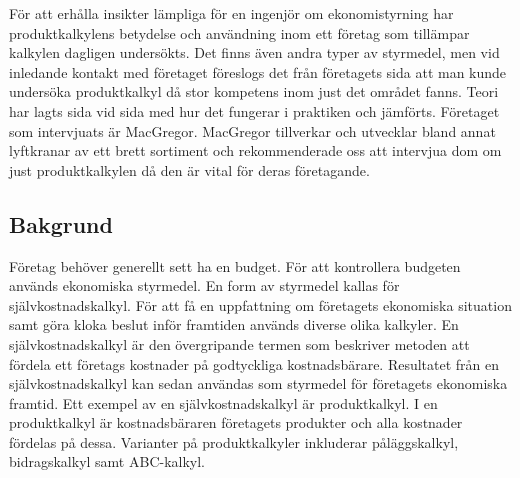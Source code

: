 För att erhålla insikter lämpliga för en ingenjör om ekonomistyrning har produktkalkylens betydelse och användning inom ett företag som tillämpar kalkylen dagligen undersökts.
Det finns även andra typer av styrmedel, men vid inledande kontakt med företaget föreslogs det från företagets sida att man kunde undersöka produktkalkyl då stor kompetens inom just det området fanns.
Teori har lagts sida vid sida med hur det fungerar i praktiken och jämförts.
Företaget som intervjuats är MacGregor.
MacGregor tillverkar och utvecklar bland annat lyftkranar av ett brett sortiment och rekommenderade oss att intervjua dom om just produktkalkylen då den är vital för deras företagande.



%
%


%
%

\subsection{Bakgrund} 
Företag behöver generellt sett ha en budget.
För att kontrollera budgeten används ekonomiska styrmedel.
En form av styrmedel kallas för självkostnadskalkyl.
För att få en uppfattning om företagets ekonomiska situation samt göra kloka beslut inför framtiden används diverse olika kalkyler.
En självkostnadskalkyl är den övergripande termen som beskriver metoden att fördela ett företags kostnader på godtyckliga kostnadsbärare.
Resultatet från en självkostnadskalkyl kan sedan användas som styrmedel för företagets ekonomiska framtid.
Ett exempel av en självkostnadskalkyl är produktkalkyl.
I en produktkalkyl är kostnadsbäraren företagets produkter och alla kostnader fördelas på dessa.
Varianter på produktkalkyler inkluderar påläggskalkyl, bidragskalkyl samt ABC-kalkyl.

